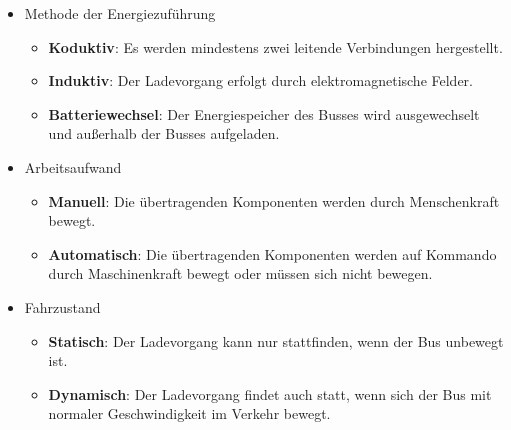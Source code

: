 \documentclass[twoside]{scrartcl}
\begin{document}
\begin{itemize}
	\item Methode der Energiezuführung
	\begin{itemize}
		\item \textbf{Koduktiv}: Es werden mindestens zwei leitende Verbindungen hergestellt.
		\item \textbf{Induktiv}: Der Ladevorgang erfolgt durch elektromagnetische Felder.
		\item \textbf{Batteriewechsel}: Der Energiespeicher des Busses wird ausgewechselt und außerhalb der Busses aufgeladen.
	\end{itemize}
	\item Arbeitsaufwand
	\begin{itemize}
		\item \textbf{Manuell}: Die übertragenden Komponenten werden durch Menschenkraft bewegt.
		\item \textbf{Automatisch}: Die übertragenden Komponenten werden auf Kommando durch Maschinenkraft bewegt oder müssen sich nicht bewegen.
	\end{itemize}
	\item Fahrzustand
	\begin{itemize}
		\item \textbf{Statisch}: Der Ladevorgang kann nur stattfinden, wenn der Bus unbewegt ist.
		\item \textbf{Dynamisch}: Der Ladevorgang findet auch statt, wenn sich der Bus mit normaler Geschwindigkeit im Verkehr bewegt.
	\end{itemize}
\end{itemize}
\end{document}
